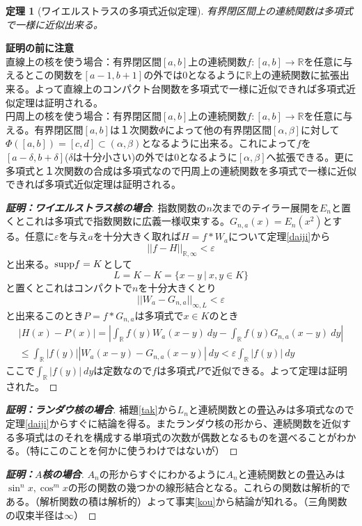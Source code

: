 \documentclass[leqno]{jsarticle}
\newtheorem{theorem}{定理}
\newcommand{\rr}{\mathbb{R}}
\newcommand{\supp}{\text{{\rm supp}}}
\newcommand{\mgn}{\infty}
\begin{document}
\begin{theorem}[ワイエルストラスの多項式近似定理]有界閉区間上の連続関数は多項式で一様に近似出来る。
\end{theorem}
{\bf 証明の前に注意}\\ 
直線上の核を使う場合：有界閉区間$[a,b]$上の連続関数$f:[a,b]\to \rr$を任意に与えるとこの関数を$[a-1,b+1]$の外では$0$となるように$\rr$上の連続関数に拡張出来る。よって直線上のコンパクト台関数を多項式で一様に近似できれば多項式近似定理は証明される。\\ 
円周上の核を使う場合：有界閉区間$[a,b]$上の連続関数$f:[a,b]\to \rr$を任意に与える。有界閉区間$[a,b]$は１次関数$\Phi$によって他の有界閉区間$[\alpha,\beta]$に対して$\Phi([a,b])=[c,d]\subset (\alpha,\beta)$となるように出来る。これによって$f$を$[a-\delta,b+\delta]$($\delta$は十分小さい)の外では$0$となるように$[\alpha,\beta]$へ拡張できる。更に多項式と１次関数の合成は多項式なので円周上の連続関数を多項式で一様に近似できれば多項式近似定理は証明される。

\begin{proof}[{\bf 証明：ワイエルストラス核の場合}]指数関数の$n$次までのテイラー展開を$E_n$と置くとこれは多項式で指数関数に広義一様収束する。$G_{n,a}(x)=E_n(x^2)$とする。任意に$\varepsilon$を与え$a$を十分大きく取れば$H=f*W_a$について定理\ref{daiji}から
\[
||f-H||_{\rr,\mgn}<\varepsilon
\]
と出来る。$\supp f=K$として
\[
L=K-K=\{x-y\ |\ x,y\in K \}
\]
と置くとこれはコンパクトで$n$を十分大きくとり
\[
||W_a-G_{n,a}||_{\mgn,L}<\varepsilon
\]
と出来るこのとき$P=f*G_{n,a}$は多項式で$x\in K$のとき
\begin{eqnarray*}
|H(x)-P(x)|=|\int_{\rr}f(y)W_a(x-y)\ dy-\int_{\rr}f(y)G_{n,a}(x-y)\ dy|\\ 
\le \int_{\rr}|f(y)||W_a(x-y)-G_{n,a}(x-y)|\ dy<\varepsilon \int_{\rr}|f(y)|\ dy
\end{eqnarray*}
ここで$\int_{\rr}|f(y)|\ dy$は定数なので$f$は多項式$P$で近似できる。よって定理は証明された。
\end{proof}


\begin{proof}[{\bf 証明：ランダウ核の場合}]補題\ref{tak}から$L_n$と連続関数との畳込みは多項式なので定理\ref{daiji}からすぐに結論を得る。またランダウ核の形から、連続関数を近似する多項式はのそれを構成する単項式の次数が偶数となるものを選べることがわかる。（特にこのことを何かに使うわけではないが）

\end{proof}

\begin{proof}[{\bf 証明：$A$核の場合}]$A_n$の形からすぐにわかるように$A_n$と連続関数との畳込みは
$\sin^nx,\cos^mx$の形の関数の幾つかの線形結合となる。これらの関数は解析的である。（解析関数の積は解析的）よって事実\ref{kou}から結論が知れる。（三角関数の収束半径は$\mgn$）

\end{proof}
\end{document}
